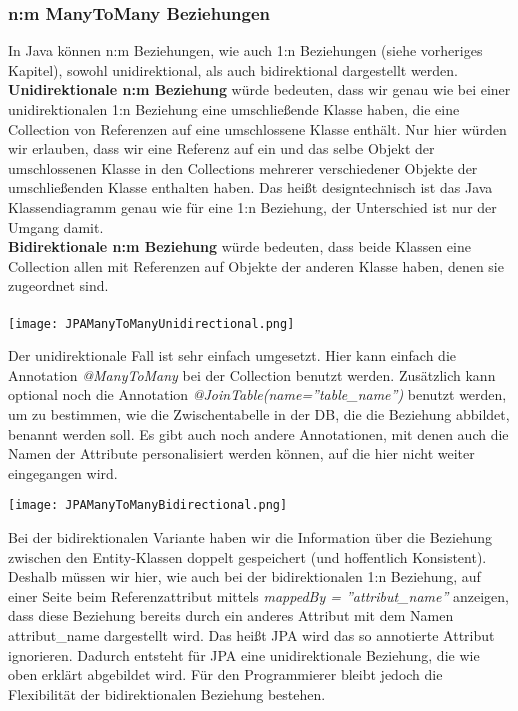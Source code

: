 \subsubsection{n:m ManyToMany Beziehungen}
In Java können n:m Beziehungen, wie auch 1:n Beziehungen (siehe vorheriges Kapitel), sowohl unidirektional, als auch bidirektional dargestellt werden.\\
\textbf{Unidirektionale n:m Beziehung} würde bedeuten, dass wir genau wie bei einer unidirektionalen 1:n Beziehung eine umschließende Klasse haben, die eine Collection von Referenzen auf eine umschlossene Klasse enthält. Nur hier würden wir erlauben, dass wir eine Referenz auf ein und das selbe Objekt der umschlossenen Klasse in den Collections mehrerer verschiedener Objekte der umschließenden Klasse enthalten haben. Das heißt designtechnisch ist das Java Klassendiagramm genau wie für eine 1:n Beziehung, der Unterschied ist nur der Umgang damit.\\
\textbf{Bidirektionale n:m Beziehung} würde bedeuten, dass beide Klassen eine Collection allen mit Referenzen auf Objekte der anderen Klasse haben, denen sie zugeordnet sind.\\
\\

\texttt{[image: JPAManyToManyUnidirectional.png]}

Der unidirektionale Fall ist sehr einfach umgesetzt. Hier kann einfach die Annotation \textit{@ManyToMany} bei der Collection benutzt werden. Zusätzlich kann optional noch die Annotation \textit{@JoinTable(name=''table\_name'')} benutzt werden, um zu bestimmen, wie die Zwischentabelle in der DB, die die Beziehung abbildet, benannt werden soll. Es gibt auch noch andere Annotationen, mit denen auch die Namen der Attribute personalisiert werden können, auf die hier nicht weiter eingegangen wird.

\texttt{[image: JPAManyToManyBidirectional.png]}

Bei der bidirektionalen Variante haben wir die Information über die Beziehung zwischen den Entity-Klassen doppelt gespeichert (und hoffentlich Konsistent). Deshalb müssen wir hier, wie auch bei der bidirektionalen 1:n Beziehung, auf einer Seite beim Referenzattribut mittels \textit{mappedBy = ''attribut\_name''} anzeigen, dass diese Beziehung bereits durch ein anderes Attribut mit dem Namen attribut\_name dargestellt wird. Das heißt JPA wird das so annotierte Attribut ignorieren. Dadurch entsteht für JPA eine unidirektionale Beziehung, die wie oben erklärt abgebildet wird. Für den Programmierer bleibt jedoch die Flexibilität der bidirektionalen Beziehung bestehen.


